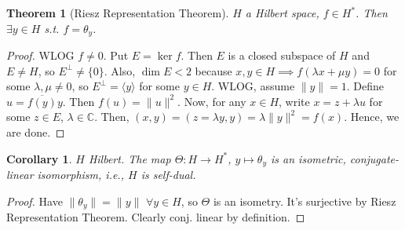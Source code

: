 \documentclass{article}
\theoremstyle{definition}
\theoremstyle{remark}
\theoremstyle{plain}
\newtheorem{thm}[defn]{Theorem}
\newtheorem{crly}[defn]{Corollary}
\newcommand{\CC}{\mathbb{C}}
\begin{document}
\begin{thm}[Riesz Representation Theorem]
    $H$ a Hilbert space, $f\in H^\ast$. Then $\exists y\in H$ s.t. $f=\theta_y$.
\end{thm}
\begin{proof}
    WLOG $f\neq 0$. Put $E=\ker f$. Then $E$ is a closed subspace of $H$ and $E\neq H$, so $E^\perp\neq \{0\}$. Also, $\dim E<2$ because $x,y\in H\implies f(\lambda x+\mu y)=0$ for some $\lambda,\mu\neq 0$, so $E^\perp=\langle y\rangle$ for some $y\in H$. WLOG, assume $\|y\|=1$. Define $u=\overline{f(y)}y$. Then $f(u)=\|u\|^2$. Now, for any $x\in H$, write $x=z+\lambda u$ for some $z\in E$, $\lambda\in \CC$. Then, $(x,y)=(z=\lambda y,y)=\lambda\|y\|^2=f(x)$. Hence, we are done.
\end{proof}
\begin{crly}
    $H$ Hilbert. The map $\Theta:H\to H^\ast$, $y\mapsto\theta_y$ is an isometric, conjugate-linear isomorphism, i.e., $H$ is self-dual.
\end{crly}
\begin{proof}
    Have $\|\theta_y\|=\|y\|$ $\forall y\in H$, so $\Theta$ is an isometry. It's surjective by Riesz Representation Theorem. Clearly conj. linear by definition.
\end{proof}
\end{document}
